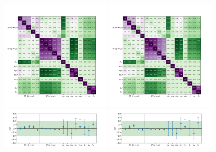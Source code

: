 \begin{frame}{}
\smaller
    \begin{center}
    \includegraphics[width=0.4\textwidth]{chapters/Analysis/sectionCalibration/figures/jetToTauh/corr2_lltauTight_splitJetFlavor.png}
    \includegraphics[width=0.4\textwidth]{chapters/Analysis/sectionCalibration/figures/jetToTauh/corr2_lltauVTight_splitJetFlavor.png}
    \includegraphics[width=0.4\textwidth]{chapters/Analysis/sectionCalibration/figures/jetToTauh/pull2_lltauTight_splitJetFlavor.png}
    \includegraphics[width=0.4\textwidth]{chapters/Analysis/sectionCalibration/figures/jetToTauh/pull2_lltauVTight_splitJetFlavor.png}
    \end{center}
\end{frame}



